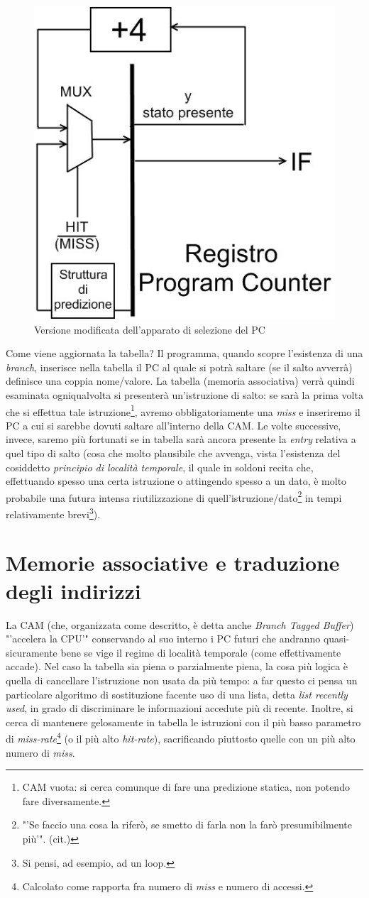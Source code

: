 \begin{figure}[!h]
\centering
\includegraphics[width=0.4\columnwidth]{img/plusFourModified}
\caption{Versione modificata dell'apparato di selezione del PC}
\label{fig:plusFourModified}
\end{figure}

Come viene aggiornata la tabella? Il programma, quando scopre l'esistenza di una \textit{branch}, inserisce nella tabella il PC al quale si potrà saltare (se il salto avverrà) definisce una coppia nome/valore. La tabella (memoria associativa) verrà quindi esaminata ogniqualvolta si presenterà un'istruzione di salto: se sarà la prima volta che si effettua tale istruzione\footnote{CAM vuota: si cerca comunque di fare una predizione statica, non potendo fare diversamente.}, avremo obbligatoriamente una \textit{miss} e inseriremo il PC a cui si sarebbe dovuti saltare all'interno della CAM. Le volte successive, invece, saremo più fortunati se in tabella sarà ancora presente la \textit{entry} relativa a quel tipo di salto (cosa che molto plausibile che avvenga, vista l'esistenza del cosiddetto \textit{principio di località temporale}, il quale in soldoni recita che, effettuando spesso una certa istruzione o attingendo spesso a un dato, è molto probabile una futura intensa riutilizzazione di quell'istruzione/dato\footnote{"'Se faccio una cosa la riferò, se smetto di farla non la farò presumibilmente più'". (cit.)} in tempi relativamente brevi\footnote{Si pensi, ad esempio, ad un loop.}).

\section{Memorie associative e traduzione degli indirizzi}
\label{sec:associativeIndirizzi}

La CAM (che, organizzata come descritto, è detta anche \textit{Branch Tagged Buffer}) "'accelera la CPU'" conservando al suo interno i PC futuri che andranno quasi-sicuramente bene se vige il regime di località temporale (come effettivamente accade).
Nel caso la tabella sia piena o parzialmente piena, la cosa più logica è quella di cancellare l'istruzione non usata da più tempo: a far questo ci pensa un particolare algoritmo di sostituzione facente uso di una lista, detta \textit{list recently used}, in grado di discriminare le informazioni accedute più di recente. Inoltre, si cerca di mantenere gelosamente in tabella le istruzioni con il più basso parametro di \textit{miss-rate}\footnote{Calcolato come rapporta fra numero di \textit{miss} e numero di accessi.} (o il più alto \textit{hit-rate}), sacrificando piuttosto quelle con un più alto numero di \textit{miss}.

